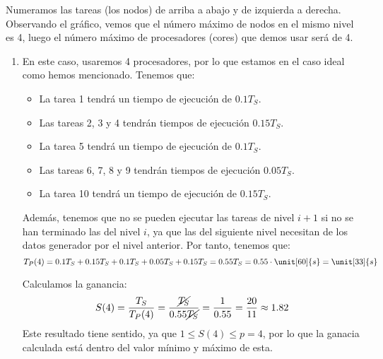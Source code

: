 \begin{ejercicio}
    Numeramos las tareas (los nodos) de arriba a abajo y de izquierda a derecha. 
    Observando el gráfico, vemos que el número máximo de nodos en el mismo nivel es 4, luego el número máximo de procesadores (cores) que demos usar será de 4.

    \begin{enumerate}
        \item En este caso, usaremos 4 procesadores, por lo que estamos en el caso ideal como hemos mencionado. Tenemos que:
            \begin{itemize}
                \item La tarea 1 tendrá un tiempo de ejecución de $0.1T_S$.
                \item Las tareas 2, 3 y 4 tendrán tiempos de ejecución $0.15T_S$.
                \item La tarea 5 tendrá un tiempo de ejecución de $0.1T_S$.
                \item Las tareas 6, 7, 8 y 9 tendrán tiempos de ejecución $0.05T_S$.
                \item La tarea 10 tendrá un tiempo de ejecución de $0.15T_S$.
            \end{itemize}

            Además, tenemos que no se pueden ejecutar las tareas de nivel $i+1$ si no se han terminado las del nivel $i$,
            ya que las del siguiente nivel necesitan de los datos generador por el nivel anterior. Por tanto, tenemos que:
            \begin{equation*}
                T_P(4) = 0.1T_S + 0.15T_S + 0.1T_S + 0.05T_S + 0.15T_S = 0.55T_S = 0.55\cdot \unit[60]{s} = \unit[33]{s}
            \end{equation*}

            Calculamos la ganancia:
            \begin{equation*}
                S(4) = \dfrac{T_S}{T_P(4)} = \dfrac{\cancel{T_S}}{0.55\cancel{T_S}} = \dfrac{1}{0.55} = \dfrac{20}{11} \approx 1.82
            \end{equation*}
            Este resultado tiene sentido, ya que $1\leq S(4)\leq p=4$, por lo que la ganacia calculada está dentro del valor mínimo y máximo de esta.
        

\end{enumerate}
\end{ejercicio}
